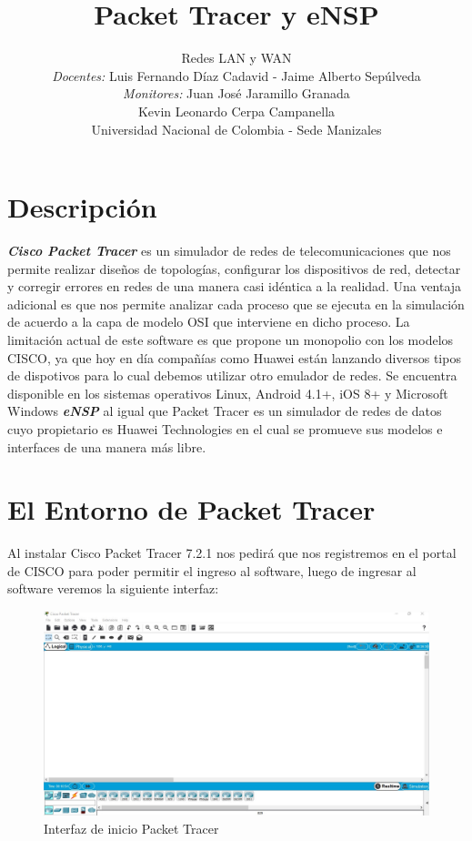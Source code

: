 \documentclass[journal]{IEEEtran}
\title{\textbf{Packet Tracer y eNSP}}
\author{Redes LAN y WAN \\
	\textit{Docentes:} Luis Fernando Díaz Cadavid - Jaime Alberto Sepúlveda\\ 
	\textit{Monitores:} Juan José Jaramillo Granada \\
	Kevin Leonardo Cerpa Campanella \\
	Universidad Nacional de Colombia - Sede Manizales}
\date{}
\begin{document}
\maketitle

\section{Descripción}
\textbf{\textit{Cisco Packet Tracer}} es un simulador de redes de telecomunicaciones que nos permite realizar diseños de topologías, configurar los dispositivos de red, detectar y corregir errores en redes de una manera casi idéntica a la realidad. Una ventaja adicional es que nos permite analizar cada proceso que se ejecuta en la simulación de acuerdo a la capa de modelo OSI que interviene en dicho proceso. La limitación actual de este software es que propone un monopolio con los modelos CISCO, ya que hoy en día compañías como Huawei están lanzando diversos tipos de dispotivos para lo cual debemos utilizar otro emulador de redes. Se encuentra disponible en los sistemas operativos Linux, Android 4.1+, iOS 8+ y Microsoft Windows \cite{pt_wiki} \newline
\textbf{\textit{eNSP}} al igual que Packet Tracer es un simulador de redes de datos cuyo propietario es Huawei Technologies en el cual se promueve sus modelos e interfaces de una manera más libre.

\section{El Entorno de Packet Tracer}
Al instalar Cisco Packet Tracer 7.2.1 nos pedirá que nos registremos en el portal de CISCO para poder permitir el ingreso al software, luego de ingresar al software veremos la siguiente interfaz:

\begin{figure}[ht]
	\centering
	\includegraphics[scale=0.17]{index_pt.jpg}
	\caption{Interfaz de inicio Packet Tracer}
	\label{index_pt}
\end{figure}
\end{document}
